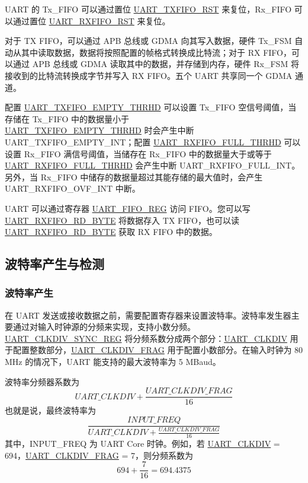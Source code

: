 \documentclass[main\_\_CN.tex]{subfiles}
\begin{document}
UART 的 Tx\_FIFO 可以通过置位 \hyperref[fielddesc:UARTTXFIFORST]{UART\_TXFIFO\_RST} 来复位，Rx\_FIFO 可以通过置位 \hyperref[fielddesc:UARTRXFIFORST]{UART\_RXFIFO\_RST} 来复位。

对于 TX FIFO，可以通过 APB 总线或 GDMA 向其写入数据，硬件 Tx\_FSM 自动从其中读取数据，数据将按照配置的帧格式转换成比特流；对于 RX FIFO，可以通过 APB 总线或 GDMA 读取其中的数据，并存储到内存，硬件 Rx\_FSM 将接收到的比特流转换成字节并写入 RX FIFO。五个 UART 共享同一个 GDMA 通道。

配置 \hyperref[fielddesc:UARTTXFIFOEMPTYTHRHD]{UART\_TXFIFO\_EMPTY\_THRHD} 可以设置 Tx\_FIFO 空信号阈值，当存储在 Tx\_FIFO 中的数据量小于 \\\hyperref[fielddesc:UARTTXFIFOEMPTYTHRHD]{UART\_TXFIFO\_EMPTY\_THRHD} 时会产生中断 UART\_TXFIFO\_EMPTY\_INT；配置 \hyperref[fielddesc:UARTRXFIFOFULLTHRHD]{UART\_RXFIFO\_FULL\_THRHD} 可以设置 Rx\_FIFO 满信号阈值，当储存在 Rx\_FIFO 中的数据量大于或等于 \hyperref[fielddesc:UARTRXFIFOFULLTHRHD]{UART\_RXFIFO\_FULL\_THRHD} 会产生中断 UART\_RXFIFO\_FULL\_INT。另外，当 Rx\_FIFO 中储存的数据量超过其能存储的最大值时，会产生 UART\_RXFIFO\_OVF\_INT 中断。

UART 可以通过寄存器 \hyperref[regdesc:UARTFIFOREG]{UART\_FIFO\_REG} 访问 FIFO。您可以写 \hyperref[fielddesc:UARTRXFIFORDBYTE]{UART\_RXFIFO\_RD\_BYTE} 将数据存入 TX FIFO，也可以读 \hyperref[fielddesc:UARTRXFIFORDBYTE]{UART\_RXFIFO\_RD\_BYTE} 获取 RX FIFO 中的数据。

\subsection{波特率产生与检测}

\subsubsection{波特率产生}

在 UART 发送或接收数据之前，需要配置寄存器来设置波特率。波特率发生器主要通过对输入时钟源的分频来实现，支持小数分频。\hyperref[regdesc:UARTCLKDIVSYNCREG]{UART\_CLKDIV\_SYNC\_REG} 将分频系数分成两个部分：\hyperref[fielddesc:UARTCLKDIV]{UART\_CLKDIV} 用于配置整数部分，\hyperref[fielddesc:UARTCLKDIVFRAG]{UART\_CLKDIV\_FRAG} 用于配置小数部分。在输入时钟为 80 MHz 的情况下，UART 能支持的最大波特率为 5 MBaud。

波特率分频器系数为
\[
    \hyperref[fielddesc:UARTCLKDIV]{UART\_CLKDIV} + \frac{\hyperref[fielddesc:UARTCLKDIVFRAG]{UART\_CLKDIV\_FRAG}}{16}
\]
也就是说，最终波特率为
\[
    \frac{INPUT\_FREQ}{\hyperref[fielddesc:UARTCLKDIV]{UART\_CLKDIV} + \frac{\hyperref[fielddesc:UARTCLKDIVFRAG]{UART\_CLKDIV\_FRAG}}{16}}
\]
其中，INPUT\_FREQ 为 UART Core 时钟。例如，若 \hyperref[fielddesc:UARTCLKDIV]{UART\_CLKDIV} = 694，\hyperref[fielddesc:UARTCLKDIVFRAG]{UART\_CLKDIV\_FRAG} = 7，则分频系数为
\[
    694 + \frac{7}{16} = 694.4375
\]
\end{document}
